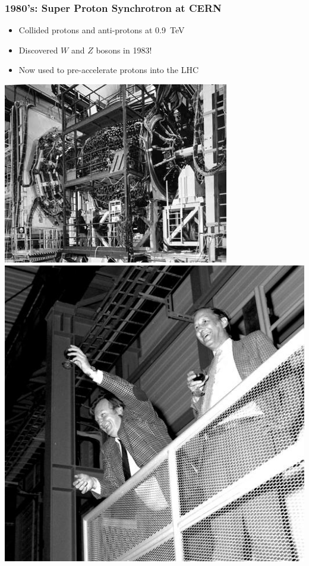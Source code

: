 \documentclass[compress]{beamer}
\begin{document}
\begin{frame}
\frametitle{1980's: Super Proton Synchrotron at CERN}

\begin{itemize}
\item Collided protons and anti-protons at 0.9~TeV
\item Discovered $W$ and $Z$ bosons in 1983!
\item Now used to pre-accelerate protons into the LHC
\end{itemize}

\begin{center}
\includegraphics[height=4 cm]{ua2.jpg} \hspace{1 cm}
\includegraphics[height=4 cm]{happy_about_z_discovery.jpg}
\end{center}
\end{frame}
\end{document}
